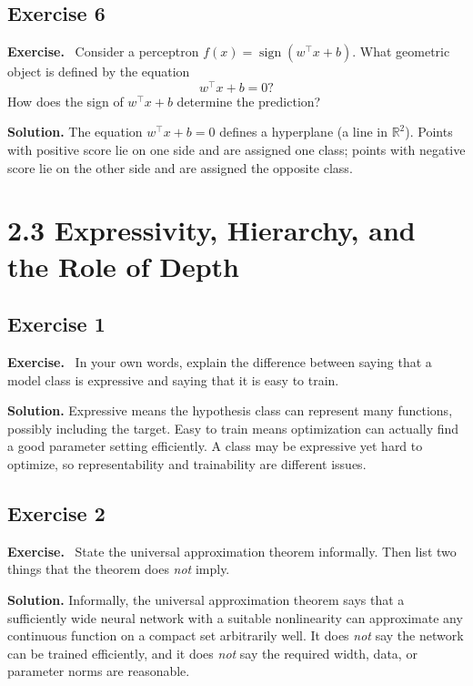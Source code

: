 \documentclass[11pt]{article}
\newenvironment{exercisebox}{\begin{framed}\noindent\textbf{Exercise.}\ }{\end{framed}}
\begin{document}
\subsection*{Exercise 6}
\begin{exercisebox}
Consider a perceptron $f(x)=\operatorname{sign}(w^\top x+b)$. What geometric object is defined by the equation
\[
w^\top x+b=0?
\]
How does the sign of $w^\top x+b$ determine the prediction?
\end{exercisebox}
\textbf{Solution.} The equation $w^\top x+b=0$ defines a hyperplane (a line in $\mathbb R^2$). Points with positive score lie on one side and are assigned one class; points with negative score lie on the other side and are assigned the opposite class.

\section{2.3 Expressivity, Hierarchy, and the Role of Depth}
\subsection*{Exercise 1}
\begin{exercisebox}
In your own words, explain the difference between saying that a model class is expressive and saying that it is easy to train.
\end{exercisebox}
\textbf{Solution.} Expressive means the hypothesis class can represent many functions, possibly including the target. Easy to train means optimization can actually find a good parameter setting efficiently. A class may be expressive yet hard to optimize, so representability and trainability are different issues.

\subsection*{Exercise 2}
\begin{exercisebox}
State the universal approximation theorem informally. Then list two things that the theorem does \emph{not} imply.
\end{exercisebox}
\textbf{Solution.} Informally, the universal approximation theorem says that a sufficiently wide neural network with a suitable nonlinearity can approximate any continuous function on a compact set arbitrarily well. It does \emph{not} say the network can be trained efficiently, and it does \emph{not} say the required width, data, or parameter norms are reasonable.
\end{document}
